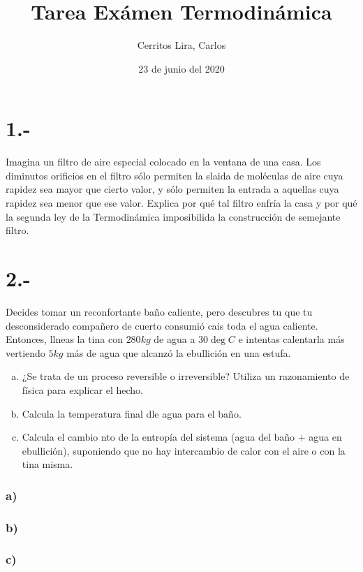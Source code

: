 \documentclass{article}
\title{Tarea Exámen Termodinámica}
\author{Cerritos Lira, Carlos}
\date{23 de junio del 2020}
\begin{document}
\maketitle
\section*{1.-}
Imagina un filtro de aire especial colocado en la ventana de una casa. Los diminutos orificios en el filtro sólo
permiten la slaida de moléculas de aire cuya rapidez sea mayor que cierto valor, y sólo permiten la entrada a aquellas cuya 
rapidez sea menor que ese valor. Explica por qué tal filtro enfría la casa y por qué la segunda ley de la Termodinámica 
imposibilida la construcción de semejante filtro. 
\begin{tcolorbox}[breakable]

\end{tcolorbox}

\section*{2.-}
Decides tomar un reconfortante baño caliente, pero descubres tu que tu desconsiderado compañero de cuerto consumió cais toda el 
agua caliente. Entonces, llneas la tina con $280kg$ de agua a $30 \deg C$ e intentas calentarla más vertiendo $5kg$ más de agua 
que alcanzó la ebullición en una estufa.
\begin{enumerate}[a)]
    \item ¿Se trata de un proceso reversible o irreversible? Utiliza un razonamiento de física para explicar el hecho.
    \item Calcula la temperatura final dle agua para el baño.
    \item Calcula el cambio nto de la entropía del sistema (agua del baño + agua en ebullición), suponiendo
    que no hay intercambio de calor con el aire o con la tina misma.
\end{enumerate}
\begin{tcolorbox}[breakable]
    \subsubsection*{a)}
    
    \subsubsection*{b)}
    
    \subsubsection*{c)}
\end{tcolorbox}
\end{document}
